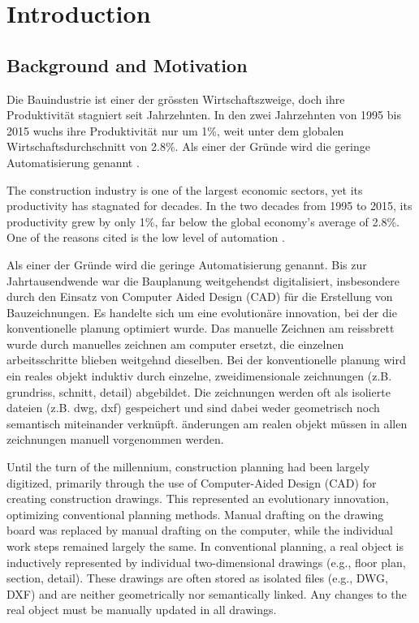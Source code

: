 \chapter{Introduction}
\label{sec:introduction}

\section{Background and Motivation}
\begin{German}
    Die Bauindustrie ist einer der grössten Wirtschaftszweige, doch ihre Produktivität stagniert seit Jahrzehnten. In den zwei Jahrzehnten von 1995 bis 2015 wuchs ihre Produktivität nur um 1\%, weit unter dem globalen Wirtschaftsdurchschnitt von 2.8\%. Als einer der Gründe wird die geringe Automatisierung genannt \cite{barbosaReinventingConstructionRoute2017}.
\end{German}
\begin{English}
    The construction industry is one of the largest economic sectors, yet its productivity has stagnated for decades. In the two decades from 1995 to 2015, its productivity grew by only 1\%, far below the global economy's average of 2.8\%. One of the reasons cited is the low level of automation \cite{barbosaReinventingConstructionRoute2017}.
\end{English}

\begin{German}
    Als einer der Gründe wird die geringe Automatisierung genannt. Bis zur Jahrtausendwende war die Bauplanung weitgehendst digitalisiert, insbesondere durch den Einsatz von Computer Aided Design (CAD) für die Erstellung von Bauzeichnungen. Es handelte sich um eine evolutionäre innovation, bei der die konventionelle planung optimiert wurde. Das manuelle Zeichnen am reissbrett wurde durch manuelles zeichnen am computer ersetzt, die einzelnen arbeitsschritte blieben weitgehnd dieselben. Bei der konventionelle planung wird ein reales objekt induktiv durch einzelne, zweidimensionale zeichnungen (z.B. grundriss, schnitt, detail) abgebildet. Die zeichnungen werden oft als isolierte dateien (z.B. dwg, dxf) gespeichert und sind dabei weder geometrisch noch semantisch miteinander verknüpft. änderungen am realen objekt müssen in allen zeichnungen manuell vorgenommen werden.
\end{German}

\begin{English}
    Until the turn of the millennium, construction planning had been largely digitized, primarily through the use of Computer-Aided Design (CAD) for creating construction drawings. This represented an evolutionary innovation, optimizing conventional planning methods. Manual drafting on the drawing board was replaced by manual drafting on the computer, while the individual work steps remained largely the same. In conventional planning, a real object is inductively represented by individual two-dimensional drawings (e.g., floor plan, section, detail). These drawings are often stored as isolated files (e.g., DWG, DXF) and are neither geometrically nor semantically linked. Any changes to the real object must be manually updated in all drawings.
\end{English}

